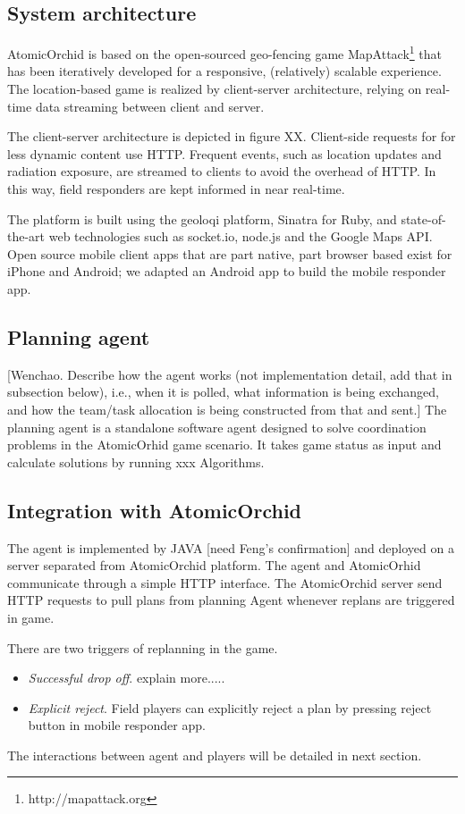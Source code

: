 \subsection{System architecture}
AtomicOrchid is based on the open-sourced geo-fencing game MapAttack\footnote{http://mapattack.org} that has been iteratively developed for a responsive, (relatively) scalable experience.  The location-based game is realized by client-server architecture, relying on real-time data streaming between client and server.

The client-server architecture is depicted in figure XX. Client-side requests for for less dynamic content use HTTP. Frequent events, such as location updates and radiation exposure, are streamed to clients to avoid the overhead of HTTP. In this way, field responders are kept informed in near real-time.

The platform is built using the geoloqi platform, Sinatra for Ruby, and state-of-the-art web technologies such as socket.io, node.js and the Google Maps API. Open source mobile client apps that are part native, part browser based exist for iPhone and Android; we adapted an Android app to build the mobile responder app.

\subsection{Planning agent}
[Wenchao. Describe how the agent works (not implementation detail, add that in subsection below), i.e., when it is polled, what information is being exchanged, and how the team/task allocation is being constructed from that and sent.]
The planning agent is a standalone software agent designed to solve coordination problems in the AtomicOrhid game scenario. It takes game status as input and calculate solutions by running xxx Algorithms. 

\subsection{Integration with AtomicOrchid}
The agent is implemented by JAVA [need Feng's confirmation] and deployed on a server separated from AtomicOrchid platform. The agent and AtomicOrhid communicate through a simple HTTP interface. The AtomicOrchid server send HTTP requests to pull plans from planning Agent whenever replans are triggered in game. 

There are two triggers of replanning in the game.
\begin{itemize}
\item \textit{Successful drop off}. explain more.....
\item \textit{Explicit reject}. Field players can explicitly reject a plan by pressing reject button in mobile responder app. 
\end{itemize} 
The interactions between agent and players will be detailed in next section.
